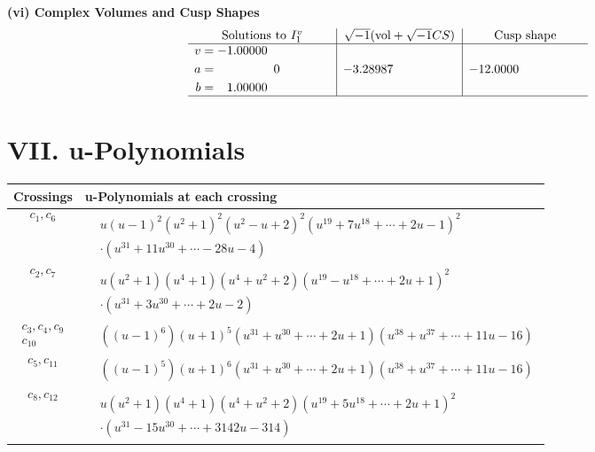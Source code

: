 \documentclass[1p]{elsarticle_modified}
\theoremstyle{definition}
\newcommand{\I}{\sqrt{-1}}
\begin{document}
\newpage\flushleft \textbf{(vi) Complex Volumes and Cusp Shapes}
$$\begin{array}{c|c|c}  
\text{Solutions to }I^v_{1}& \I (\text{vol} + \sqrt{-1}CS) & \text{Cusp shape}\\
 \hline 
\begin{aligned}
v &= -1.00000\phantom{ +0.000000I} \\
a &= \phantom{-0.000000 } 0 \\
b &= \phantom{-}1.00000\phantom{ +0.000000I}\end{aligned}
 & -3.28987\phantom{ +0.000000I} & -12.0000\phantom{ +0.000000I}\\
 \hline 
 \end{array}$$\newpage
\newpage\renewcommand{\arraystretch}{1}
\centering \section*{ VII. u-Polynomials}
\begin{tabular}{m{50pt}|m{274pt}}
Crossings & \hspace{64pt}u-Polynomials at each crossing \\
\hline $$\begin{aligned}c_{1},c_{6}\end{aligned}$$&$\begin{aligned}
&u(u-1)^2(u^2+1)^2(u^2- u+2)^2(u^{19}+7 u^{18}+\cdots+2 u-1)^{2}\\
&\cdot(u^{31}+11 u^{30}+\cdots-28 u-4)
\end{aligned}$\\
\hline $$\begin{aligned}c_{2},c_{7}\end{aligned}$$&$\begin{aligned}
&u(u^2+1)(u^4+1)(u^4+u^2+2)(u^{19}-u^{18}+\cdots+2 u+1)^{2}\\
&\cdot(u^{31}+3 u^{30}+\cdots+2 u-2)
\end{aligned}$\\
\hline $$\begin{aligned}c_{3},c_{4},c_{9}\\c_{10}\end{aligned}$$&$\begin{aligned}
&((u-1)^6)(u+1)^5(u^{31}+u^{30}+\cdots+2 u+1)(u^{38}+u^{37}+\cdots+11 u-16)
\end{aligned}$\\
\hline $$\begin{aligned}c_{5},c_{11}\end{aligned}$$&$\begin{aligned}
&((u-1)^5)(u+1)^6(u^{31}+u^{30}+\cdots+2 u+1)(u^{38}+u^{37}+\cdots+11 u-16)
\end{aligned}$\\
\hline $$\begin{aligned}c_{8},c_{12}\end{aligned}$$&$\begin{aligned}
&u(u^2+1)(u^4+1)(u^4+u^2+2)(u^{19}+5 u^{18}+\cdots+2 u+1)^{2}\\
&\cdot(u^{31}-15 u^{30}+\cdots+3142 u-314)
\end{aligned}$\\
\hline
\end{tabular}\newpage\renewcommand{\arraystretch}{1}
\end{document}

